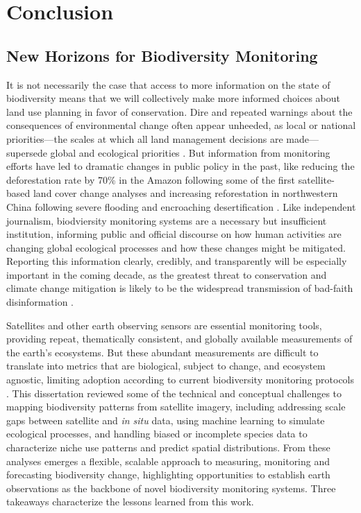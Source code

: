 \chapter{Conclusion}

\section{New Horizons for Biodiversity Monitoring}

It is not necessarily the case that access to more information on the state of biodiversity means that we will collectively make more informed choices about land use planning in favor of conservation. Dire and repeated warnings about the consequences of environmental change often appear unheeded, as local or national priorities—the scales at which all land management decisions are made—supersede global and ecological priorities \cite{Ehrlich1983-xx, Daily1999-mv, Barnosky2012-wi, IPBES2019-hl}. But information from monitoring efforts have led to dramatic changes in public policy in the past, like reducing the deforestation rate by 70\% in the Amazon following some of the first satellite-based land cover change analyses \cite{Roughgarden1991-so, Skole1993-jt, Nepstad2014-ar} and increasing reforestation in northwestern China following severe flooding and encroaching desertification \cite{Michael_A_Fullen1994-ip, Ye2005-vm}. Like independent journalism, biodviersity monitoring systems are a necessary but insufficient institution, informing public and official discourse on how human activities are changing global ecological processes and how these changes might be mitigated. Reporting this information clearly, credibly, and transparently will be especially important in the coming decade, as the greatest threat to conservation and climate change mitigation is likely to be the widespread transmission of bad-faith disinformation \cite{Iyengar2018-ij}.

Satellites and other earth observing sensors are essential monitoring tools, providing repeat, thematically consistent, and globally available measurements of the earth's ecosystems. But these abundant measurements are difficult to translate into metrics that are biological, subject to change, and ecosystem agnostic, limiting adoption according to current biodiversity monitoring protocols \cite{Geo_bon2017-ak}. This dissertation reviewed some of the technical and conceptual challenges to mapping biodiversity patterns from satellite imagery, including addressing scale gaps between satellite and \textit{in situ} data, using machine learning to simulate ecological processes, and handling biased or incomplete species data to characterize niche use patterns and predict spatial distributions. From these analyses emerges a flexible, scalable approach to measuring, monitoring and forecasting biodiversity change, highlighting opportunities to establish earth observations as the backbone of novel biodiversity monitoring systems. Three takeaways characterize the lessons learned from this work.

